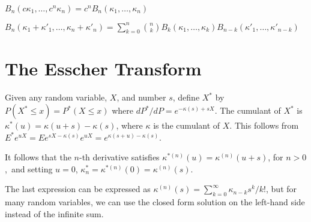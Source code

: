 \documentclass[fleqn]{amsart}
\theoremstyle{definition}
\begin{document}
\(B_n(c\kappa_1, \ldots, c^n\kappa_n) = c^nB_n(\kappa_1, \ldots, \kappa_n)\)

\(B_n(\kappa_1 + \kappa'_1, \ldots, \kappa_n + \kappa'_n) = \sum_{k=0}^n\binom{n}{k}B_k(\kappa_1,\ldots,\kappa_k) B_{n-k}(\kappa'_1,\ldots,\kappa'_{n-k})\) 
\section{The Esscher Transform}

Given any random variable, \(X\), and number \(s\), define
\(X^*\) by \(P(X^*\le x) = P^*(X\le x)\) where
\(dP^*/dP = e^{-\kappa(s) + sX}\).
The cumulant of \(X^*\) is \(\kappa^*(u) = \kappa(u + s) - \kappa(s)\),
where \(\kappa\) is the cumulant of \(X\).
This follows from \(E^* e^{uX} = Ee^{sX - \kappa(s)} e^{uX}
= e^{\kappa(s + u) - \kappa(s)}\).

It follows that the \(n\)-th derivative satisfies
\(\kappa^{*(n)}(u) = \kappa^{(n)}(u + s)\), for \(n > 0\),\
and setting $u=0$, \(\kappa^*_n = \kappa^{*(n)}(0) = \kappa^{(n)}(s)\).

The last expression can be expressed as \(\kappa^{(n)}(s) =
\sum_{k=0}^\infty \kappa_{n - k} s^k/k!\), but for many random variables,
we can use the closed form solution on the left-hand side instead of
the infinite sum.

%
%
\end{document}
